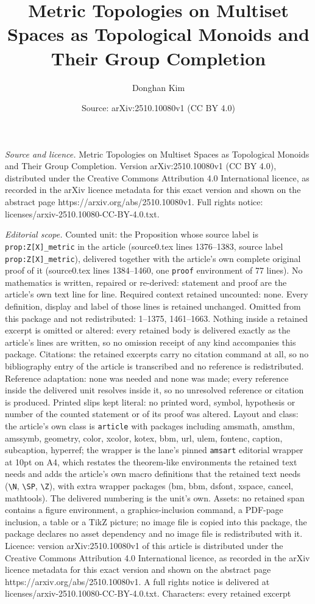 \documentclass[10pt,a4paper]{amsart}
\title[Metric Topologies on Multiset Spaces as Topological Monoids ]{Metric Topologies on Multiset Spaces as Topological Monoids and Their Group Completion}
\author{Donghan Kim}
\date{Source: arXiv:2510.10080v1 (CC BY 4.0)}
\begin{document}
\maketitle

\noindent\emph{Source and licence.} Metric Topologies on Multiset Spaces as Topological Monoids and Their Group Completion. Version arXiv:2510.10080v1 (CC BY 4.0), distributed under the Creative Commons Attribution 4.0 International licence, as recorded in the arXiv licence metadata for this exact version and shown on the abstract page https://arxiv.org/abs/2510.10080v1. Full rights notice: licenses/arxiv-2510.10080-CC-BY-4.0.txt.\par\smallskip

\noindent\textit{Editorial scope.} Counted unit: the Proposition whose source label is \texttt{prop:Z[X]\_metric} in the article (source0.tex lines 1376--1383, source label \texttt{prop:Z[X]\_metric}), delivered together with the article's own complete original proof of it (source0.tex lines 1384--1460, one \texttt{proof} environment of 77 lines). No mathematics is written, repaired or re-derived: statement and proof are the article's own text line for line. Required context retained uncounted: none. Every definition, display and label of those lines is retained unchanged. Omitted from this package and not redistributed: 1--1375, 1461--1663. Nothing inside a retained excerpt is omitted or altered: every retained body is delivered exactly as the article's lines are written, so no omission receipt of any kind accompanies this package. Citations: the retained excerpts carry no citation command at all, so no bibliography entry of the article is transcribed and no reference is redistributed. Reference adaptation: none was needed and none was made; every reference inside the delivered unit resolves inside it, so no unresolved reference or citation is produced. Printed slips kept literal: no printed word, symbol, hypothesis or number of the counted statement or of its proof was altered. Layout and class: the article's own class is \texttt{article} with packages including amsmath, amsthm, amssymb, geometry, color, xcolor, kotex, bbm, url, ulem, fontenc, caption, subcaption, hyperref; the wrapper is the lane's pinned \texttt{amsart} editorial wrapper at 10pt on A4, which restates the theorem-like environments the retained text needs and adds the article's own macro definitions that the retained text needs (\texttt{\textbackslash N}, \texttt{\textbackslash SP}, \texttt{\textbackslash Z}), with extra wrapper packages (bm, bbm, dsfont, xspace, cancel, mathtools). The delivered numbering is the unit's own. Assets: no retained span contains a figure environment, a graphics-inclusion command, a PDF-page inclusion, a table or a TikZ picture; no image file is copied into this package, the package declares no asset dependency and no image file is redistributed with it. Licence: version arXiv:2510.10080v1 of this article is distributed under the Creative Commons Attribution 4.0 International licence, as recorded in the arXiv licence metadata for this exact version and shown on the abstract page https://arxiv.org/abs/2510.10080v1. A full rights notice is delivered at licenses/arxiv-2510.10080-CC-BY-4.0.txt. Characters: every retained excerpt 
\end{document}
